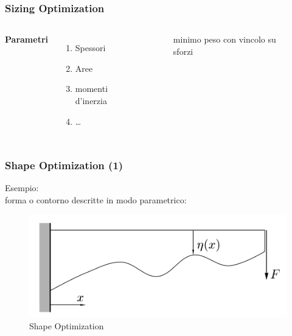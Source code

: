 \documentclass{beamer}
\begin{document}
\begin{frame}
	\frametitle{Sizing Optimization}
	\begin{columns}[c] %
		
		\textbf{Parametri}
		\begin{enumerate}
			\item Spessori
			\item Aree
			\item momenti d'inerzia
			\item \ldots
		\end{enumerate}
		
		\begin{figure}
			\centering
			\caption[]{minimo peso con vincolo su sforzi}
			\label{fig:pc}
		\end{figure}
	\end{columns}
\end{frame}



\begin{frame}
	\frametitle{Shape Optimization (1)}
	Esempio:\\
	forma o contorno descritte in modo parametrico:
	\begin{figure}
		\includegraphics[width=0.7\linewidth]{./images/shape_ex.png}
		\caption{Shape Optimization}
		\label{fig:shape1}
	\end{figure}
	
\end{frame}
\end{document}
